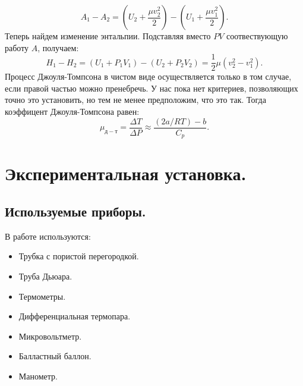 \documentclass[a4paper,11pt]{article}
\begin{document}
\begin{equation}    \label{eq1}
  A_{1} - A_{2} = \left(U_{2} + \frac{\mu v_{2}^{2}}{2}\right) - \left(U_{1} + \frac{\mu v_{1}^{2}}{2}\right).
\end{equation}
Теперь найдем изменение энтальпии. Подставляя вместо $PV$ соотвествующую работу $A$, получаем:
\begin{equation}    \label{eq2}
  H_{1} - H_{2} = \left(U_{1} + P_{1}V_{1}\right) - \left(U_{2} + P_{2}V_{2}\right) = \frac{1}{2} \mu \left(v_{2}^{2} - v_{1}^{2}\right).
\end{equation}
Процесс Джоуля-Томпсона в чистом виде осуществляется только в том случае, если правой частью можно пренебречь. У нас пока нет критериев, позволяющих точно это установить, но тем не менее предположим, что это так. Тогда коэффицент Джоуля-Томпсона равен:\\
\begin{equation}    \label{eq3}
  \mu_{д-т} = \frac{\Delta T}{\Delta P} \approx \frac{(2a/RT) - b}{C_{p}}.
\end{equation}
\section{Экспериментальная установка.}
\subsection{Используемые приборы.}
В работе используются:
\begin{itemize}
  \item Трубка с пористой перегородкой.
  \item Труба Дьюара.
  \item Термометры.
  \item Дифференциальная термопара.
  \item Микровольтметр.
  \item Балластный баллон.
  \item Манометр.
\end{itemize}
\end{document}
